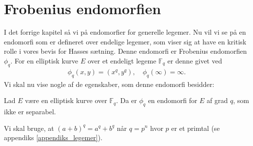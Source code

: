\section{Frobenius endomorfien}
I det forrige kapitel så vi på endomorfier for generelle legemer. Nu vil vi se på en endomorfi som er defineret over endelige legemer, som viser sig at have en kritisk rolle i vores bevis for Hasses sætning. Denne endomorfi er Frobenius endomorfien $\phi_q$. For en elliptisk kurve $E$ over et endeligt legeme $\mathbb{F}_q$ er denne givet ved
\begin{align}
	\phi_q (x, y) = (x^q, y^q), \quad \phi_q(\infty) = \infty.
\end{align}
Vi skal nu vise nogle af de egenskaber, som denne endomorfi besidder:
\begin{lemma}
\label{lemma_end_degree_not_sep}
Lad $E$ være en elliptisk kurve over $\mathbb{F}_q$. Da er $\phi_q$ en 
endomorfi for $E$ af grad $q$, som ikke er separabel.
\end{lemma}
Vi skal bruge, at $(a + b)^q = a^q + b^q$ når $q=p^n$ hvor $p$ er et primtal (se appendiks \ref{appendiks_legemer}).

